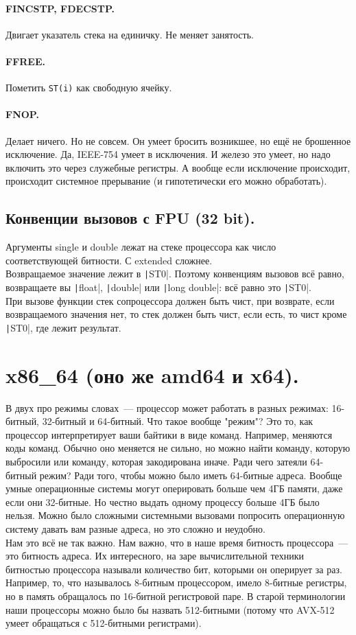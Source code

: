 \documentclass{article}
\begin{document}
    \paragraph{FINCSTP, FDECSTP.}
    Двигает указатель стека на единичку. Не меняет занятость.
    \paragraph{FFREE.}
    Пометить \Verb|ST(i)| как свободную ячейку.
    \paragraph{FNOP.}
    Делает ничего. Но не совсем. Он умеет бросить возникшее, но ещё не брошенное исключение. Да, IEEE-754 умеет в исключения. И железо это умеет, но надо включить это через служебные регистры. А вообще если исключение происходит, происходит системное прерывание (и гипотетически его можно обработать).
    \subsection{Конвенции вызовов с FPU (32 bit).}
    Аргументы single и double лежат на стеке процессора как число соответствующей битности. С extended сложнее.\\
    Возвращаемое значение лежит в \texttt|ST0|. Поэтому конвенциям вызовов всё равно, возвращаете вы \texttt|float|, \texttt|double| или \texttt|long double|: всё равно это \texttt|ST0|.\\
    При вызове функции стек сопроцессора должен быть чист, при возврате, если возвращаемого значения нет, то стек должен быть чист, если есть, то чист кроме \texttt|ST0|, где лежит результат.
    \section{x86\_64 (оно же amd64 и x64).}
    В двух про режимы словах~--- процессор может работать в разных режимах: 16-битный, 32-битный и 64-битный. Что такое вообще "режим"? Это то, как процессор интерпретирует ваши байтики в виде команд. Например, меняются коды команд. Обычно оно меняется не сильно, но можно найти команду, которую выбросили или команду, которая закодирована иначе. Ради чего затеяли 64-битный режим? Ради того, чтобы можно было иметь 64-битные адреса. Вообще умные операционные системы могут оперировать больше чем 4ГБ памяти, даже если они 32-битные. Но честно выдать одному процессу больше 4ГБ было нельзя. Можно было сложными системными вызовами попросить операционную систему давать вам разные адреса, но это сложно и неудобно.\\
    Нам это всё не так важно. Нам важно, что в наше время битность процессора~--- это битность адреса. Их интересного, на заре вычислительной техники битностью процессора называли количество бит, которыми он оперирует за раз. Например, то, что называлось 8-битным процессором, имело 8-битные регистры, но в память обращалось по 16-битной регистровой паре. В старой терминологии наши процессоры можно было бы назвать 512-битными (потому что AVX-512 умеет обращаться с 512-битными регистрами).
\end{document}
